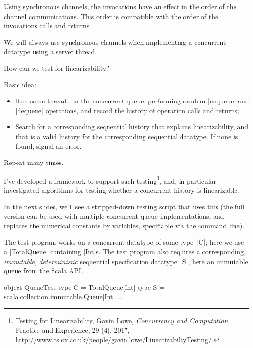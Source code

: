 
\begin{slide}

Using synchronous channels, the invocations have an effect in the order of the
channel communications.  This order is compatible with the order of the
invocations calls and returns.

We will always use synchronous channels when implementing a concurrent
datatype using a server thread.   
\end{slide}



\begin{slide}

How can we test for linearizability?

Basic idea: 
%
\begin{itemize}
\item Run some threads on the concurrent queue, performing random |enqueue|
and |dequeue| operations, and record the history of operation calls and
returns;

\item Search for a corresponding sequential history that explains
linearizability, and that is a valid history for the corresponding sequential
datatype.  If none is found, signal an error.
\end{itemize}
%
Repeat many times.
\end{slide}


\begin{slide}

I've developed a framework to support such testing\footnote{{Testing
    for Linearizability}, Gavin Lowe, \textit{Concurrency and Computation},
    Practice and Experience, 29 (4), 2017,
  \url{http://www.cs.ox.ac.uk/people/gavin.lowe/LinearizabiltyTesting/}.},
and, in particular, investigated algorithms for testing whether a concurrent
history is linearizable.

In the next slides, we'll see a stripped-down testing script that uses this
(the full version can be used with multiple concurrent queue implementations,
and replaces the numerical constants by variables, specifiable via the command
line).

\vfill
\end{slide}


\begin{slide}

The test program works on a concurrent datatype of some type~|C|; here we use
a |TotalQueue| containing |Int|s.  The test program
also requires a corresponding, \emph{immutable, deterministic}
sequential specification datatype~|S|, here an immutable queue from the Scala
API.
%
\begin{scala}
object QueueTest{
  type C = TotalQueue[Int]
  type S = scala.collection.immutable.Queue[Int]
  ...
}
\end{scala}
\end{slide}

